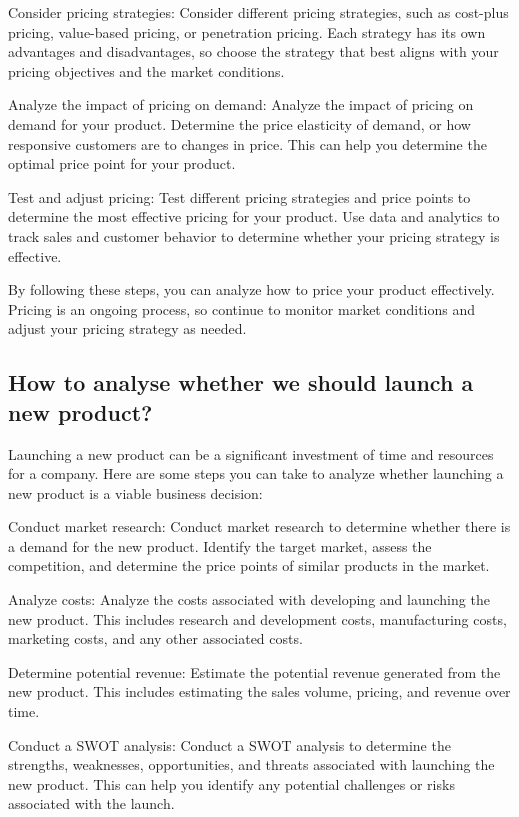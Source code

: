 \documentclass[12pt, a4paper, oneside]{article}
\begin{document}
Consider pricing strategies: Consider different pricing strategies, such as cost-plus pricing, value-based pricing, or penetration pricing. Each strategy has its own advantages and disadvantages, so choose the strategy that best aligns with your pricing objectives and the market conditions.

Analyze the impact of pricing on demand: Analyze the impact of pricing on demand for your product. Determine the price elasticity of demand, or how responsive customers are to changes in price. This can help you determine the optimal price point for your product.

Test and adjust pricing: Test different pricing strategies and price points to determine the most effective pricing for your product. Use data and analytics to track sales and customer behavior to determine whether your pricing strategy is effective.

By following these steps, you can analyze how to price your product effectively. Pricing is an ongoing process, so continue to monitor market conditions and adjust your pricing strategy as needed.

\subsection{ How to analyse whether we should launch a new product? }
Launching a new product can be a significant investment of time and resources for a company. Here are some steps you can take to analyze whether launching a new product is a viable business decision:

Conduct market research: Conduct market research to determine whether there is a demand for the new product. Identify the target market, assess the competition, and determine the price points of similar products in the market.

Analyze costs: Analyze the costs associated with developing and launching the new product. This includes research and development costs, manufacturing costs, marketing costs, and any other associated costs.

Determine potential revenue: Estimate the potential revenue generated from the new product. This includes estimating the sales volume, pricing, and revenue over time.

Conduct a SWOT analysis: Conduct a SWOT analysis to determine the strengths, weaknesses, opportunities, and threats associated with launching the new product. This can help you identify any potential challenges or risks associated with the launch.
\end{document}
